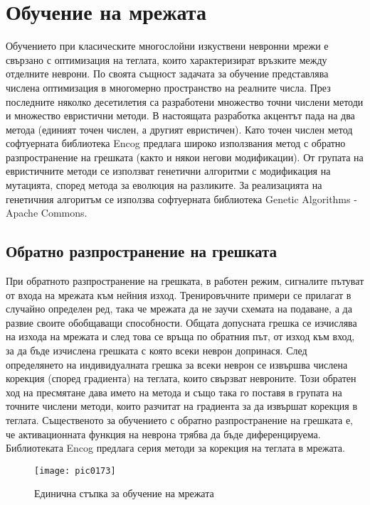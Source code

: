 \newpage
\chapter{Обучение на мрежата}
\label{chapter07}

Обучението при класическите многослойни изкуствени невронни мрежи е свързано с оптимизация на теглата, които характеризират връзките между отделните неврони. По своята същност задачата за обучение представлява числена оптимизация в многомерно пространство на реалните числа. През последните няколко десетилетия са разработени множество точни числени методи и множество евристични методи. В настоящата разработка акцентът пада на два метода (единият точен числен, а другият евристичен). Като точен числен метод софтуерната библиотека Encog предлага широко използвания метод с обратно разпространение на грешката (както и някои негови модификации). От групата на евристичните методи се използват генетични алгоритми с модификация на мутацията, според метода за еволюция на разликите. За реализацията на генетичния алгоритъм се използва софтуерната библиотека Genetic Algorithms - Apache Commons.

\section{Обратно разпространение на грешката}

При обратното разпространение на грешката, в работен режим, сигналите пътуват от входа на мрежата към нейния изход. Тренировъчните примери се прилагат в случайно определен ред, така че мрежата да не заучи схемата на подаване, а да развие своите обобщаващи способности. Общата допусната грешка се изчислява на изхода на мрежата и след това се връща по обратния път, от изход към вход, за да бъде изчислена грешката с която всеки неврон допринася. След определянето на индивидуалната грешка за всеки неврон се извършва числена корекция (според градиента) на теглата, които свързват невроните. Този обратен ход на пресмятане дава името на метода и също така го поставя в групата на точните числени методи, които разчитат на градиента за да извършат корекция в теглата. Същественото за обучението с обратно разпространение на грешката е, че активационната функция на неврона трябва да бъде диференцируема. Библиотеката Encog предлага серия методи за корекция на теглата в мрежата. 

\begin{figure}[h]
  \centering
  \texttt{[image: pic0173]}
  \caption{Единична стъпка за обучение на мрежата}
\label{fig:pic0173}
\end{figure}
\FloatBarrier


